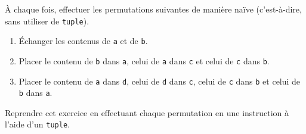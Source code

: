 \exer{}
\setcounter{numques}{0}



À chaque fois, effectuer les permutations suivantes de manière naïve (c'est-à-dire, sans utiliser de \texttt{tuple}).
\begin{enumerate}[label=\emph{\alph*)}]
  \item \'Echanger les contenus de \texttt{a} et de \texttt{b}.
  \item Placer le contenu de \texttt{b} dans \texttt{a}, celui de \texttt{a} dans \texttt{c} et celui de \texttt{c} dans \texttt{b}.
  \item Placer le contenu de \texttt{a} dans \texttt{d}, celui de \texttt{d} dans \texttt{c}, celui de \texttt{c} dans \texttt{b} et celui de \texttt{b} dans \texttt{a}.
\end{enumerate}
Reprendre cet exercice en effectuant chaque permutation en une instruction à l'aide d'un \texttt{tuple}.
